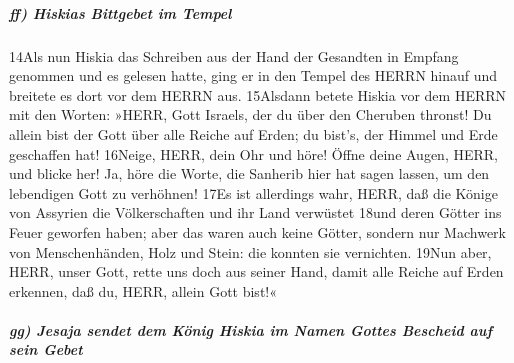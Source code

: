 \hypertarget{ff-hiskias-bittgebet-im-tempel}{%
\subparagraph{ff) Hiskias Bittgebet im
Tempel}\label{ff-hiskias-bittgebet-im-tempel}}

14Als nun Hiskia das Schreiben aus der Hand der Gesandten in Empfang
genommen und es gelesen hatte, ging er in den Tempel des HERRN hinauf
und breitete es dort vor dem HERRN aus. 15Alsdann betete Hiskia vor dem
HERRN mit den Worten: »HERR, Gott Israels, der du über den Cheruben
thronst! Du allein bist der Gott über alle Reiche auf Erden; du bist's,
der Himmel und Erde geschaffen hat! 16Neige, HERR, dein Ohr und höre!
Öffne deine Augen, HERR, und blicke her! Ja, höre die Worte, die
Sanherib hier hat sagen lassen, um den lebendigen Gott zu verhöhnen!
17Es ist allerdings wahr, HERR, daß die Könige von Assyrien die
Völkerschaften und ihr Land verwüstet 18und deren Götter ins Feuer
geworfen haben; aber das waren auch keine Götter, sondern nur Machwerk
von Menschenhänden, Holz und Stein: die konnten sie vernichten. 19Nun
aber, HERR, unser Gott, rette uns doch aus seiner Hand, damit alle
Reiche auf Erden erkennen, daß du, HERR, allein Gott bist!«

\hypertarget{gg-jesaja-sendet-dem-kuxf6nig-hiskia-im-namen-gottes-bescheid-auf-sein-gebet}{%
\subparagraph{gg) Jesaja sendet dem König Hiskia im Namen Gottes
Bescheid auf sein
Gebet}\label{gg-jesaja-sendet-dem-kuxf6nig-hiskia-im-namen-gottes-bescheid-auf-sein-gebet}}

